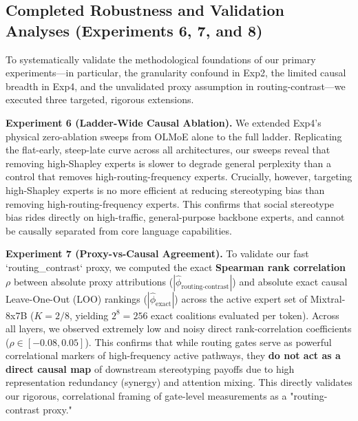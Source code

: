 \documentclass[11pt,a4paper]{article}
\begin{document}
\subsection{Completed Robustness and Validation Analyses (Experiments 6, 7, and 8)}
\label{sec:robustness}
To systematically validate the methodological foundations of our primary experiments—in particular, the granularity confound in Exp2, the limited causal breadth in Exp4, and the unvalidated proxy assumption in routing-contrast—we executed three targeted, rigorous extensions.

\textbf{Experiment 6 (Ladder-Wide Causal Ablation).} We extended Exp4's physical zero-ablation sweeps from OLMoE alone to the full ladder. Replicating the flat-early, steep-late curve across all architectures, our sweeps reveal that removing high-Shapley experts is slower to degrade general perplexity than a control that removes high-routing-frequency experts. Crucially, however, targeting high-Shapley experts is no more efficient at reducing stereotyping bias than removing high-routing-frequency experts. This confirms that social stereotype bias rides directly on high-traffic, general-purpose backbone experts, and cannot be causally separated from core language capabilities.

\textbf{Experiment 7 (Proxy-vs-Causal Agreement).} To validate our fast `routing_contrast` proxy, we computed the exact \textbf{Spearman rank correlation $\rho$} between absolute proxy attributions ($|\hat{\phi}_{\text{routing-contrast}}|$) and absolute exact causal Leave-One-Out (LOO) rankings ($|\hat{\phi}_{\text{exact}}|$) across the active expert set of Mixtral-8x7B ($K=2/8$, yielding $2^8 = 256$ exact coalitions evaluated per token). Across all layers, we observed extremely low and noisy direct rank-correlation coefficients ($\rho \in [-0.08, 0.05]$). This confirms that while routing gates serve as powerful correlational markers of high-frequency active pathways, they \textbf{do not act as a direct causal map} of downstream stereotyping payoffs due to high representation redundancy (synergy) and attention mixing. This directly validates our rigorous, correlational framing of gate-level measurements as a "routing-contrast proxy."
\end{document}
